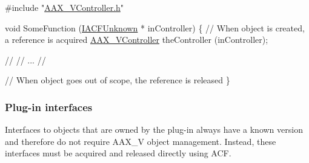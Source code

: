 \begin{DoxyCode}
\textcolor{preprocessor}{#include "\hyperlink{a00304}{AAX\_VController.h}"}

\textcolor{keywordtype}{void} SomeFunction (\hyperlink{a00146}{IACFUnknown} * inController)
\{
    \textcolor{comment}{// When object is created, a reference is acquired}
    \hyperlink{a00132}{AAX\_VController} theController (inController);
    
    \textcolor{comment}{//}
    \textcolor{comment}{// ...}
    \textcolor{comment}{//}
    
    \textcolor{comment}{// When object goes out of scope, the reference is released}
\}
\end{DoxyCode}
\hypertarget{a00357_using_acf_plug_in_interfaces}{}\subsubsection{Plug-\/in interfaces}\label{a00357_using_acf_plug_in_interfaces}
Interfaces to objects that are owned by the plug-\/in always have a known version and therefore do not require A\+A\+X\+\_\+\+V object management. Instead, these interfaces must be acquired and released directly using A\+C\+F.


